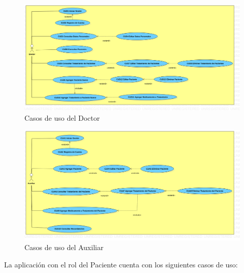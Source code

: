 	
	\begin{figure}[htb]
	\centering
	\includegraphics[width=1.1\textwidth]{images/cap2/DCUDoctor2}
	\caption{Casos de uso del Doctor} \label{fig:casosdeusoD}
\end{figure}

	\begin{figure}[htb]
		\centering
		\includegraphics[width=1.1\textwidth]{images/cap2/DCUAuxiliar2}
		\caption{Casos de uso del Auxiliar} \label{fig:casosdeusoA}
	\end{figure}


La aplicación con el rol del Paciente cuenta con los siguientes casos de uso:

